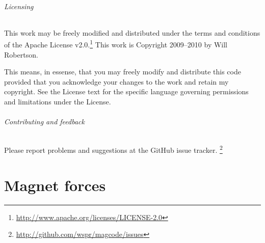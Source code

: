 \documentclass{article}
\begin{document}
\paragraph{Licensing}
This work may be freely modified and distributed under the terms and conditions of the Apache License v2.0.\footnote{\url{http://www.apache.org/licenses/LICENSE-2.0}}
This work is Copyright 2009--2010 by Will Robertson.

This means, in essense, that you may freely modify and distribute this
code provided that you acknowledge your changes to the work and retain
my copyright. See the License text for the specific language governing
permissions and limitations under the License.

\paragraph{Contributing and feedback}
Please report problems and suggestions at the GitHub issue tracker.%
\footnote{\url{http://github.com/wspr/magcode/issues}}

\clearpage
\part{Magnet forces}

\printbibliography
\end{document}
